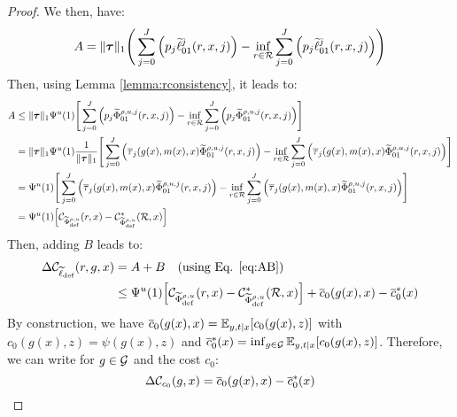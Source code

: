 \begin{appendices}
\begin{proof}
We then, have:
\begin{equation}
    A = \|\boldsymbol{\tau}\|_1 \Bigg(\sum_{j=0}^J \Big(p_j\widetilde{\ell}_{01}^j(r,x,j)\Big) - \inf_{r\in\mathcal{R}}\sum_{j=0}^J \Big(p_j\widetilde{\ell}_{01}^j(r,x,j)\Big)\Bigg)
\end{equation}
Then, using Lemma \ref{lemma:rconsistency}, it leads to:
\begin{equation}
    \begin{aligned}
        A & \leq \|\boldsymbol{\tau}\|_1 \Psi^u(1) \Bigg[\sum_{j=0}^J \Big(p_j\widetilde{\Phi}^{\rho,u,j}_{01}(r,x,j)\Big) - \inf_{r\in\mathcal{R}}\sum_{j=0}^J \Big(p_j\widetilde{\Phi}^{\rho,u,j}_{01}(r,x,j)\Big)\Bigg] \\
        & = \|\boldsymbol{\tau}\|_1 \Psi^u(1)\frac{1}{\|\boldsymbol{\tau}\|_1} \Bigg[\sum_{j=0}^J \Big(\overline{\tau}_j(g(x),m(x),x)\widetilde{\Phi}^{\rho,u,j}_{01}(r,x,j)\Big) - \inf_{r\in\mathcal{R}}\sum_{j=0}^J \Big(\overline{\tau}_j(g(x),m(x),x)\widetilde{\Phi}^{\rho,u,j}_{01}(r,x,j)\Big)\Bigg] \\
        & =  \Psi^u(1) \Bigg[\sum_{j=0}^J \Big(\overline{\tau}_j(g(x),m(x),x)\widetilde{\Phi}^{\rho,u,j}_{01}(r,x,j)\Big) - \inf_{r\in\mathcal{R}}\sum_{j=0}^J \Big(\overline{\tau}_j(g(x),m(x),x)\widetilde{\Phi}^{\rho,u,j}_{01}(r,x,j)\Big)\Bigg] \\
        & = \Psi^u(1) \Big[\mathcal{C}_{\widetilde{\Phi}^{\rho, u}_{\text{def}}}(r,x) - \mathcal{C}_{\widetilde{\Phi}^{\rho, u}_{\text{def}}}^\ast(\mathcal{R},x)\Big]
    \end{aligned}
\end{equation}
Then, adding $B$ leads to:
\begin{equation}
    \begin{aligned}
        \Delta\mathcal{C}_{\widetilde{\ell}_{\text{def}}}(r,g,x) & = A + B \quad \text{(using Eq. \ref{eq:AB}}) \\
        & \leq \Psi^u(1) \Big[\mathcal{C}_{\widetilde{\Phi}^{\rho, u}_{\text{def}}}(r,x) - \mathcal{C}_{\widetilde{\Phi}^{\rho, u}_{\text{def}}}^\ast(\mathcal{R},x)\Big] + \overline{c}_0(g(x),x) - \overline{c}^\ast_0(x) \\
    \end{aligned}
\end{equation}
By construction, we have $\overline{c}_0(g(x),x)=\mathbb{E}_{y,t|x}[c_0(g(x),z)]$ with $c_0(g(x),z) =\psi(g(x), z)$ and $\overline{c}^\ast_0(x)=\inf_{g\in\mathcal{G}}\mathbb{E}_{y,t|x}[c_0(g(x),z)]$. Therefore, we can write for $g\in\mathcal{G}$ and the cost $c_0$:
\begin{equation}
    \Delta\mc{C}_{c_0}(g,x) = \overline{c}_0(g(x),x) - \overline{c}^\ast_0(x)

\end{equation}
\end{proof}
\end{appendices}
